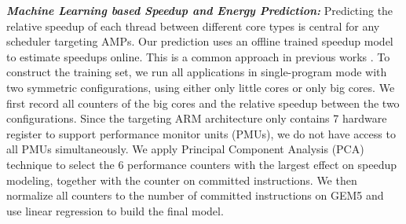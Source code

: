 \textbf{\textit{Machine Learning based Speedup and Energy Prediction:}} 
Predicting the relative speedup of each thread between different core types is central for any scheduler targeting AMPs. Our prediction uses an offline trained speedup model to estimate speedups online. This is a common approach in previous works \cite{van2013fairness,jibaja2016portable,saez2012leveraging}.
To construct the training set, we run all applications in single-program mode with two symmetric configurations, using either only little cores or only big cores. We first record all counters of the big cores and the relative speedup between the two configurations. Since the targeting ARM architecture only contains 7 hardware register to support performance monitor units (PMUs), we do not have access to all PMUs simultaneously. We apply Principal Component Analysis (PCA) technique \cite{witten2016data} to select the 6 performance counters with the largest effect on speedup modeling, together with the counter on committed instructions. We then normalize all counters to the number of committed instructions on GEM5 and use linear regression to build the final model. 


